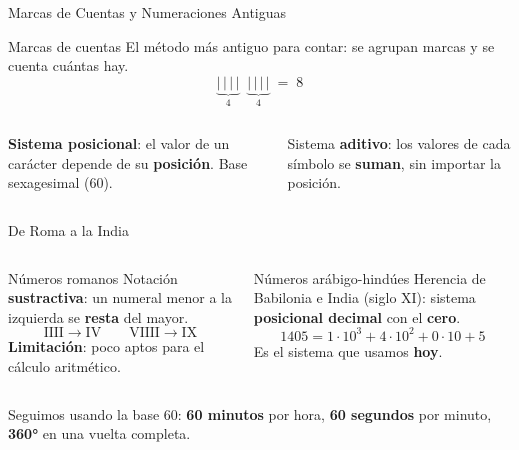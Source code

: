 \documentclass[aspectratio=169]{beamer}
\begin{document}
\begin{frame}{Marcas de Cuentas y Numeraciones Antiguas}
  \begin{block}{Marcas de cuentas}
    El método más antiguo para contar: se agrupan marcas y se cuenta
    cuántas hay.
    \[
      \underbrace{|\,|\,|\,|}_{4}\;\;\underbrace{|\,|\,|\,|}_{4} \;=\; 8
    \]
  \end{block}
  \vspace{4pt}
  \begin{columns}[T]
    \begin{mwextra}
      \textbf{Sistema posicional}: el valor de un carácter depende de
      su \textbf{posición}. Base sexagesimal (60).
    \end{mwextra}
    \begin{mwextra}
      Sistema \textbf{aditivo}: los valores de cada símbolo se
      \textbf{suman}, sin importar la posición.
    \end{mwextra}
  \end{columns}
\end{frame}

\begin{frame}{De Roma a la India}
  \begin{columns}[T]
    \begin{block}{Números romanos}
      Notación \textbf{sustractiva}: un numeral menor a la izquierda
      se \textbf{resta} del mayor.
      \[
        \text{IIII} \to \text{IV}
        \qquad
        \text{VIIII} \to \text{IX}
      \]
      \textbf{Limitación}: poco aptos para el cálculo aritmético.
    \end{block}
    \begin{block}{Números arábigo-hindúes}
      Herencia de Babilonia e India (siglo XI): sistema
      \textbf{posicional decimal} con el \textbf{cero}.
      \[
        1405 = 1\cdot10^{3}+4\cdot10^{2}+0\cdot10+5
      \]
      Es el sistema que usamos \textbf{hoy}.
    \end{block}
  \end{columns}
  \vspace{4pt}
  \begin{mwextra}
    Seguimos usando la base 60: \textbf{60 minutos} por hora,
    \textbf{60 segundos} por minuto, \textbf{360°} en una vuelta
    completa.
  \end{mwextra}
\end{frame}
\end{document}
